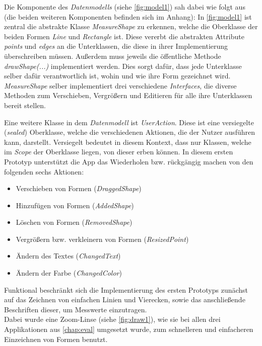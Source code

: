 \noindent
Die Komponente des \emph{Datenmodells} (siehe \autoref{fig:model1}) sah dabei wie folgt aus (die beiden weiteren Komponenten befinden sich im Anhang):
In \autoref{fig:model1} ist zentral die abstrakte Klasse \emph{MeasureShape} zu erkennen, welche die Oberklasse der beiden Formen \emph{Line} und \emph{Rectangle} ist.
Diese vererbt die abstrakten Attribute \emph{points} und \emph{edges} an die Unterklassen, die diese in ihrer Implementierung überschreiben müssen.
Außerdem muss jeweils die öffentliche Methode \emph{drawShape(...)} implementiert werden.
Dies sorgt dafür, dass jede Unterklasse selber dafür verantwortlich ist, wohin und wie ihre Form gezeichnet wird. 
\emph{MeasureShape} selber implementiert drei verschiedene \emph{Interfaces}, die diverse Methoden zum Verschieben, Vergrößern und Editieren für alle ihre Unterklassen bereit stellen. \\

\noindent
Eine weitere Klasse in dem \emph{Datenmodell} ist \emph{UserAction}.
Diese ist eine versiegelte (\emph{sealed}) Oberklasse, welche die verschiedenen Aktionen, die der Nutzer ausführen kann, darstellt.
Versiegelt bedeutet in diesem Kontext, dass nur Klassen, welche im \emph{Scope} der Oberklasse liegen, von dieser erben können.
In diesem ersten Prototyp unterstützt die App das Wiederholen bzw. rückgängig machen von den folgenden sechs Aktionen: 

\begin{itemize}
  \item Verschieben von Formen (\emph{DraggedShape})
  \item Hinzufügen von Formen (\emph{AddedShape})
  \item Löschen von Formen (\emph{RemovedShape})
  \item Vergrößern bzw. verkleinern von Formen (\emph{ResizedPoint})
  \item Ändern des Textes (\emph{ChangedText})
  \item Ändern der Farbe (\emph{ChangedColor})
\end{itemize}

\noindent
Funktional beschränkt sich die Implementierung des ersten Prototyps zunächst auf das Zeichnen von einfachen Linien und Vierecken, sowie das anschließende Beschriften dieser, um Messwerte einzutragen. \\

Dabei wurde eine Zoom-Linse (siehe \autoref{fig:draw1}), wie sie bei allen drei Applikationen aus \autoref{chap:eval} umgesetzt wurde, zum schnelleren und einfacheren Einzeichnen von Formen benutzt. \\

